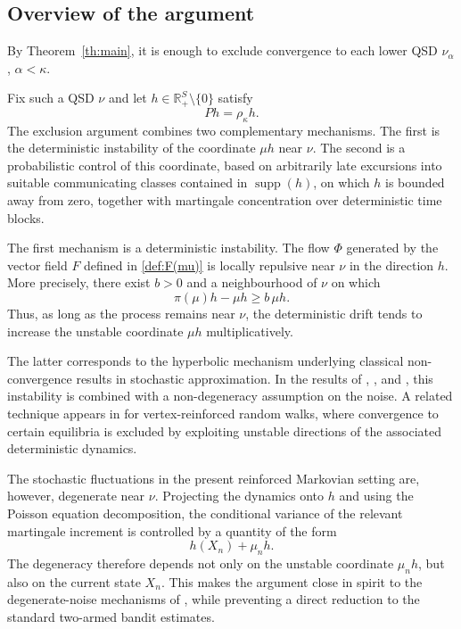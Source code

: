 \documentclass[10pt,letterpaper]{article}
\theoremstyle{compactplain}
\theoremstyle{compactdefinition}
\DeclareMathOperator{\supp}{supp}
\newcommand{\1}{\mathds{1}}
\begin{document}
\subsection{Overview of the argument}


By Theorem~\ref{th:main}, it is enough to exclude convergence to each lower QSD \(\nu_\alpha\), \(\alpha<\kappa\). 


Fix such a QSD \(\nu\) and let
\(h\in\mathbb R_+^S\setminus\{0\}\) satisfy
\[
Ph=\rho_\kappa h.
\]
The exclusion argument combines two complementary mechanisms. The first is the
deterministic instability of the coordinate \(\mu h\) near \(\nu\). The
second is a probabilistic control of this coordinate, based on arbitrarily
late excursions into suitable communicating classes contained in
\(\supp(h)\), on which \(h\) is bounded away from zero, together with
martingale concentration over deterministic time blocks.



The first mechanism is a deterministic instability. The flow \(\Phi\) generated by the vector field
\(F\) defined in \eqref{def:F(mu)} is locally repulsive near \(\nu\) in the
direction \(h\). More precisely, there exist \(b>0\) and a neighbourhood of
\(\nu\) on which
\[
\pi(\mu)h-\mu h\geq b\,\mu h.
\]
Thus, as long as the process remains near \(\nu\), the deterministic drift tends to increase the unstable coordinate \(\mu h\) multiplicatively.

The latter corresponds to the hyperbolic mechanism underlying classical non-convergence results
in stochastic approximation. In the results of
\cite{pemantle1990nonconvergence}, \cite{tarres2000pieges}, \cite{raimond2023nonconvergenceunstableequilibriumscontinuoustime} and \cite{Ben96}, this instability is combined with a non-degeneracy assumption on the noise. A related technique appears in \cite{pemantle1992vertex} for
vertex-reinforced random walks, where convergence to certain equilibria is
excluded by exploiting unstable directions of the associated deterministic
dynamics.

The stochastic fluctuations in the present reinforced Markovian setting are,
however, degenerate near \(\nu\). Projecting the dynamics onto \(h\) and using
the Poisson equation decomposition, the conditional variance of the relevant
martingale increment is controlled by a quantity of the form
\[
h(X_n)+\mu_nh.
\]
The degeneracy therefore depends not only on the unstable coordinate
\(\mu_nh\), but also on the current state \(X_n\). This makes the argument close
in spirit to the degenerate-noise mechanisms of
\cite{pages2004can,tarres2001pieges}, while preventing a direct reduction to
the standard two-armed bandit estimates.
\end{document}
